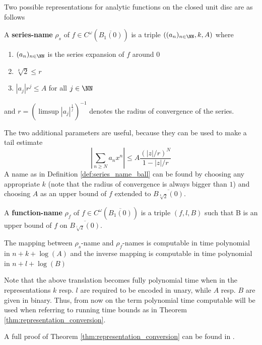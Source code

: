 	 Two possible representations for analytic functions on the closed unit disc are as follows
	 \begin{definition}\label{def:series_name_ball}
	 	A \textbf{series-name} $\rho_s$ of $f \in C^\omega(\overline{B_1(0)})$ is a triple $((a_n)_{n \in \NN}, k, A)$ where 
	 	\begin{enumerate}
	 		\item $(a_n)_{n \in \NN}$ is the series expansion of $f$ around $0$
	 		\item $\sqrt[k]{2} \leq r$ 
	 		\item $|a_j|r^j \leq A$ for all $j \in \NN$
	 	\end{enumerate}
	 	and $r = (\limsup |a_j|^{\frac{1}{j}})^{-1}$ denotes the radius of convergence of the series.
	 \end{definition}
	 The two additional parameters are useful, because they can be used to make a tail estimate 
	 \begin{equation}\label{eqn:tail_estimate}
	  \left | \sum_{n \geq N} a_nx^n \right | \leq A \frac{(|z|/r)^N}{1-|z|/r}
	 \end{equation}
   A name as in Definition \ref{def:series_name_ball} can be found by choosing
   any appropriate $k$ (note that the radius of convergence is always bigger
   than $1$) and choosing $A$ as an upper bound of $f$ extended to
   $\overline{B_{\sqrt[k]{2}}(0)}$.  
   \begin{definition}\label{def: function
     name ball}
	 	A \textbf{function-name} $\rho_f$ of $f \in C^\omega(\overline{B_1(0)})$ is a triple $(f, l, B)$ such that
		B is an upper bound of $f$ on $\overline{B_{\sqrt[l]{2}}(0)}$.
	 \end{definition}
	 \begin{theorem}\cite{Kawamura}\label{thm:representation_conversion}
	 	The mapping between $\rho_s$-name and $\rho_f$-names is computable in time polynomial in 
	 	$n+k+\log(A)$ and the inverse mapping is computable in time polynomial in $n+l+\log(B)$ 
	 \end{theorem}
   Note that the above translation becomes fully polynomial time when in the
   representations $k$ resp. $l$ are required to be encoded in unary, while $A$
   resp. $B$ are given in binary. 
   Thus, from now on the term polynomial time computable will be used when
   referring to running time bounds as in Theorem
   \ref{thm:representation_conversion}.

	 A full proof of Theorem \ref{thm:representation_conversion} can be found in \cite{Kawamura}. 

